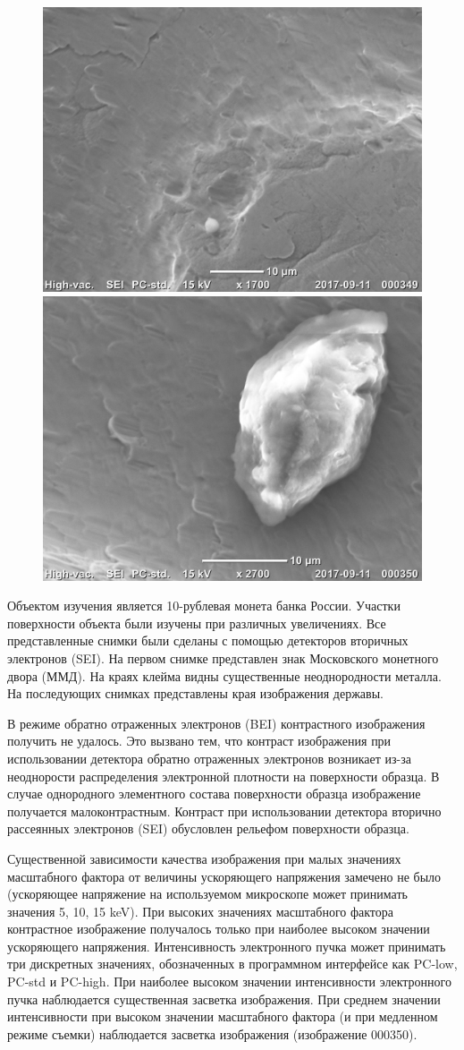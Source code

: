 \documentclass[12pt]{article}
\begin{document}
\begin{figure}[!ht]
\includegraphics[width=0.5\linewidth]{pictures/20170911_000349.jpg}
\includegraphics[width=0.5\linewidth]{pictures/20170911_000350.jpg}
\end{figure}

Объектом изучения является 10-рублевая монета банка России. Участки поверхности объекта были изучены при различных увеличениях. Все представленные снимки были сделаны с помощью детекторов вторичных электронов (SEI). На первом снимке представлен знак Московского монетного двора (ММД). На краях клейма видны существенные неоднородности металла. На последующих снимках представлены края изображения державы. \par
В режиме обратно отраженных электронов (BEI) контрастного изображения получить не удалось. Это вызвано тем, что контраст изображения при использовании детектора обратно отраженных электронов  возникает из-за неоднорости распределения электронной плотности на поверхности образца. В случае однородного элементного состава поверхности образца изображение получается малоконтрастным. Контраст при использовании детектора вторично рассеянных электронов (SEI) обусловлен рельефом поверхности образца. \par
Существенной зависимости качества изображения при малых значениях масштабного фактора от величины ускоряющего напряжения замечено не было (ускоряющее напряжение на используемом микроскопе может принимать значения 5, 10, 15 keV). При высоких значениях масштабного фактора контрастное изображение получалось только при наиболее высоком значении ускоряющего напряжения. Интенсивность электронного пучка может принимать три дискретных значениях, обозначенных в программном интерфейсе как PC-low, PC-std и PC-high. При наиболее высоком значении интенсивности электронного пучка наблюдается существенная засветка изображения. При среднем значении интенсивности при высоком значении масштабного фактора (и при медленном режиме съемки) наблюдается засветка изображения (изображение 000350). 
\end{document}
